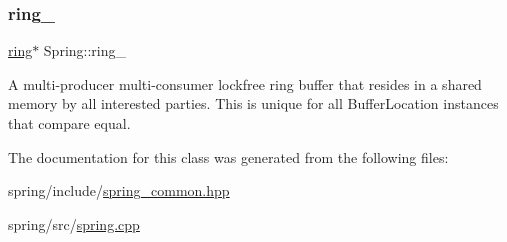 \subsubsection{\texorpdfstring{ring\+\_\+}{ring\_}}
{\footnotesize\ttfamily \hyperlink{structring}{ring}$\ast$ Spring\+::ring\+\_\+\hspace{0.3cm}{\ttfamily [private]}}

A multi-\/producer multi-\/consumer lockfree ring buffer that resides in a shared memory by all interested parties. This is unique for all Buffer\+Location instances that compare equal. 

The documentation for this class was generated from the following files\+:\begin{DoxyCompactItemize}
\item 
spring/include/\hyperlink{spring__common_8hpp}{spring\+\_\+common.\+hpp}\item 
spring/src/\hyperlink{spring_8cpp}{spring.\+cpp}\end{DoxyCompactItemize}
